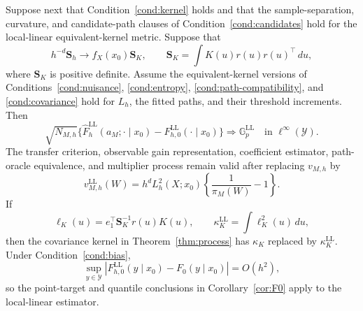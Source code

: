 \begin{proposition}
Suppose next that Condition~\ref{cond:kernel} holds and that the
sample-separation, curvature, and candidate-path clauses of
Condition~\ref{cond:candidates} hold for the local-linear equivalent-kernel
metric. Suppose that
\[
h^{-d}\mathbf S_h\to f_X(x_0)\mathbf S_K,
\qquad
\mathbf S_K=\int K(u)r(u)r(u)^\top\,du,
\]
where \(\mathbf S_K\) is positive definite. Assume the equivalent-kernel
versions of Conditions~\ref{cond:nuisance}, \ref{cond:entropy},
\ref{cond:path-compatibility}, and \ref{cond:covariance} hold for \(L_h\), the
fitted paths, and their threshold increments. Then
\begin{equation}
\sqrt{N_{M,h}}
\{\widehat F_h^{\mathrm{LL}}(a_M;\cdot\mid x_0)
-F_{h,0}^{\mathrm{LL}}(\cdot\mid x_0)\}
\Rightarrow
\mathbb G_p^{\mathrm{LL}}
\quad\text{in }\ell^\infty(\mathcal Y).
\label{eq:ll-process-limit}
\end{equation}
The transfer criterion, observable gain representation, coefficient estimator, path-oracle equivalence, and multiplier process remain valid after replacing \(v_{M,h}\) by
\begin{equation}
v_{M,h}^{\mathrm{LL}}(W)
=h^dL_h^2(X;x_0)
\left\{\frac1{\pi_M(W)}-1\right\}.
\label{eq:ll-transfer-weight}
\end{equation}
If
\[
\ell_K(u)=e_1^\top\mathbf S_K^{-1}r(u)K(u),
\qquad
\kappa_K^{\mathrm{LL}}=\int\ell_K^2(u)\,du,
\]
then the covariance kernel in Theorem~\ref{thm:process} has \(\kappa_K\) replaced by \(\kappa_K^{\mathrm{LL}}\). Under Condition~\ref{cond:bias},
\[
\sup_{y\in\mathcal Y}
|F_{h,0}^{\mathrm{LL}}(y\mid x_0)-F_0(y\mid x_0)|
=O(h^2),
\]
so the point-target and quantile conclusions in Corollary~\ref{cor:F0} apply to the local-linear estimator.
\end{proposition}

